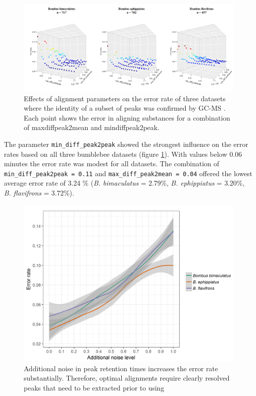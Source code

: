 \begin{figure}[htbp]
\centering
\includegraphics[width=13cm]{figures/parameter_space}
\caption{Effects of alignment parameters on the error rate of three datasets where the identity of a subset of peaks was confirmed by GC-MS \citep{Dellicour.2013}. Each point shows the error in aligning substances for a combination of max\textunderscore diff\textunderscore peak2mean and min\textunderscore diff\textunderscore peak2peak.}
\label{figure:parameterspace}
\end{figure}

The parameter \texttt{min\_diff\_peak2peak} showed the strongest
influence on the error rates based on all three bumblebee datasets
(figure \ref{figure:parameterspace}). With values below 0.06 minutes the
error rate was modest for all datasets. The combination of
\texttt{min\_diff\_peak2peak\ =\ 0.11} and
\texttt{max\_diff\_peak2mean\ =\ 0.04} offered the lowest average error
rate of 3.24 \% (\emph{B. bimaculatus} = 2.79\%, \emph{B. ephippiatus} =
3.20\%, \emph{B. flavifrons} = 3.72\%).

\begin{figure}[htbp]
\centering
\includegraphics[width=13cm]{figures/noise_simulation}
\caption{Additional noise in peak retention times increases the error rate substantially. Therefore, optimal alignments require clearly resolved peaks that need to be extracted prior to using }
\label{figure:noise}
\end{figure}

